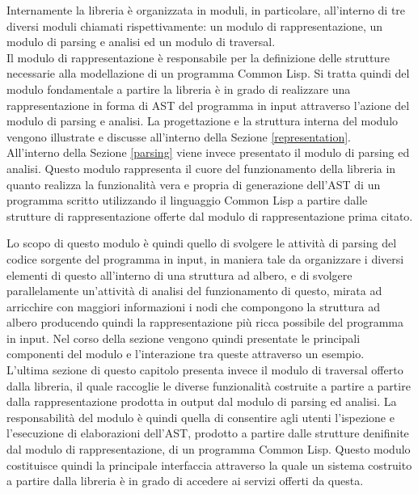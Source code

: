 \documentclass{book}
\begin{document}
Internamente la libreria è organizzata in moduli, in particolare, all'interno di
tre diversi moduli chiamati rispettivamente: un modulo di rappresentazione, un
modulo di parsing e analisi ed un modulo di traversal.\\

Il modulo di rappresentazione è responsabile per la definizione delle strutture
necessarie alla modellazione di un programma Common Lisp. Si tratta quindi del
modulo fondamentale a partire la libreria è in grado di realizzare una
rappresentazione in forma di AST del programma in input attraverso l'azione del
modulo di parsing e analisi. La progettazione e la struttura interna del modulo
vengono illustrate e discusse all'interno della Sezione \ref{representation}.\\

All'interno della Sezione \ref{parsing} viene invece presentato il modulo di
parsing ed analisi. Questo modulo rappresenta il cuore del funzionamento della
libreria in quanto realizza la funzionalità vera e propria di generazione
dell'AST di un programma scritto utilizzando il linguaggio Common Lisp a partire
dalle strutture di rappresentazione offerte dal modulo di rappresentazione prima
citato.

Lo scopo di questo modulo è quindi quello di svolgere le attività di parsing del
codice sorgente del programma in input, in maniera tale da organizzare i diversi
elementi di questo all'interno di una struttura ad albero, e di svolgere
parallelamente un'attività di analisi del funzionamento di questo, mirata ad
arricchire con maggiori informazioni i nodi che compongono la struttura ad
albero producendo quindi la rappresentazione più ricca possibile del programma
in input. Nel corso della sezione vengono quindi presentate le principali
componenti del modulo e l'interazione tra queste attraverso un esempio.\\

L'ultima sezione di questo capitolo presenta invece il modulo di traversal
offerto dalla libreria, il quale raccoglie le diverse funzionalità costruite a
partire a partire dalla rappresentazione prodotta in output dal modulo di
parsing ed analisi. La responsabilità del modulo è quindi quella di consentire
agli utenti l'ispezione e l'esecuzione di elaborazioni dell'AST, prodotto a
partire dalle strutture denifinite dal modulo di rappresentazione, di un
programma Common Lisp. Questo modulo costituisce quindi la principale
interfaccia attraverso la quale un sistema costruito a partire dalla libreria è
in grado di accedere ai servizi offerti da questa.
\end{document}
